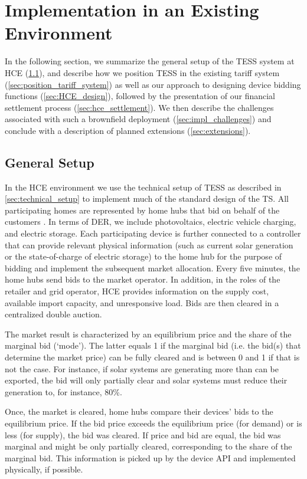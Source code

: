 \section{Implementation in an Existing Environment}\label{sec:challenges}

In the following section, we summarize the general setup of the TESS system at HCE (\cref{sec:hce_market_setup}), and describe how we position TESS in the existing tariff system (\cref{sec:position_tariff_system}) as well as our approach to designing device bidding functions (\cref{sec:HCE_design}), followed by the presentation of our financial settlement process (\cref{sec:hce_settlement}). We then describe the challenges associated with such a brownfield deployment (\cref{sec:impl_challenges}) and conclude with a description of planned extensions (\cref{sec:extensions}).

\subsection{General Setup}\label{sec:hce_market_setup}

In the HCE environment we use the technical setup of TESS as described in \cref{sec:technical_setup} to implement much of the standard design of the TS. All participating homes are represented by home hubs that bid on behalf of the customers \citep{powernet2021}. In terms of DER, we include photovoltaics, electric vehicle charging, and electric storage. Each participating device is further connected to a controller that can provide relevant physical information (such as current solar generation or the state-of-charge of electric storage) to the home hub for the purpose of bidding and implement the subsequent market allocation. Every five minutes, the home hubs send bids to the market operator. In addition, in the roles of the retailer and grid operator, HCE provides information on the supply cost, available import capacity, and unresponsive load. Bids are then cleared in a centralized double auction. 

The market result is characterized by an equilibrium price and the share of the marginal bid (`mode'). The latter equals 1 if the marginal bid (i.e. the bid(s) that determine the market price) can be fully cleared and is between 0 and 1 if that is not the case. For instance, if solar systems are generating more than can be exported, the bid will only partially clear and solar systems must reduce their generation to, for instance, 80\%.

Once, the market is cleared, home hubs compare their devices' bids to the equilibrium price. If the bid price exceeds the equilibrium price (for demand) or is less (for supply), the bid was cleared. 
If price and bid are equal, the bid was marginal and might be only partially cleared, corresponding to the share of the marginal bid.
This information is picked up by the device API and implemented physically, if possible.

